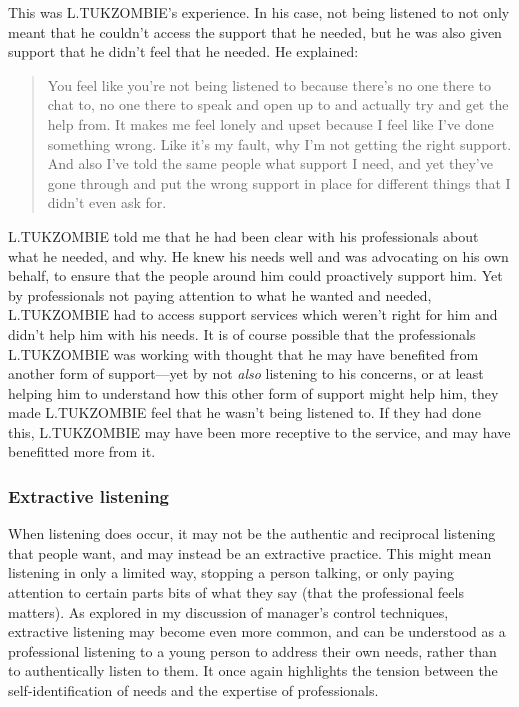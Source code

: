 This was L.TUKZOMBIE’s experience. In his case, not being listened to not only meant that he couldn’t access the support that he needed, but he was also given support that he didn’t feel that he needed. He explained: 
\begin{quote}
You feel like you're not being listened to because there's no one there to chat to, no one there to speak and open up to and actually try and get the help from. It makes me feel lonely and upset because I feel like I've done something wrong. Like it's my fault, why I'm not getting the right support. And also I've told the same people what support I need, and yet they've gone through and put the wrong support in place for different things that I didn't even ask for.
\end{quote}
L.TUKZOMBIE told me that he had been clear with his professionals about what he needed, and why. He knew his needs well and was advocating on his own behalf, to ensure that the people around him could proactively support him. Yet by professionals not paying attention to what he wanted and needed, L.TUKZOMBIE had to access support services which weren't right for him and didn't help him with his needs. It is of course possible that the professionals L.TUKZOMBIE was working with thought that he may have benefited from another form of support—yet by not \emph{also} listening to his concerns, or at least helping him to understand how this other form of support might help him, they made L.TUKZOMBIE feel that he wasn't being listened to. If they had done this, L.TUKZOMBIE may have been more receptive to the service, and may have benefitted more from it.

\subsubsection{Extractive listening}
When listening does occur, it may not be the authentic and reciprocal listening that people want, and may instead be an extractive practice. This might mean listening in only a limited way, stopping a person talking, or only paying attention to certain parts bits of what they say (that the professional feels matters). As explored in my discussion of manager's control techniques, extractive listening may become even more common, and can be understood as a professional listening to a young person to address their own needs, rather than to authentically listen to them. It once again highlights the tension between the self-identification of needs and the expertise of professionals. 

